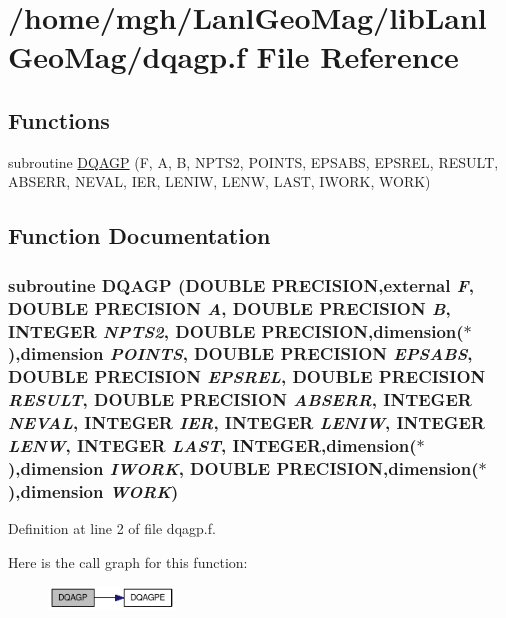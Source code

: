 \hypertarget{dqagp_8f}{
\section{/home/mgh/LanlGeoMag/libLanlGeoMag/dqagp.f File Reference}
\label{dqagp_8f}
}
\subsection*{Functions}
\begin{CompactItemize}
\item 
subroutine \hyperlink{dqagp_8f_3809d8d2a43b03d1f3c0f7833c0d82c8}{DQAGP} (F, A, B, NPTS2, POINTS, EPSABS, EPSREL, RESULT, ABSERR, NEVAL, IER, LENIW, LENW, LAST, IWORK, WORK)
\end{CompactItemize}


\subsection{Function Documentation}
\hypertarget{dqagp_8f_3809d8d2a43b03d1f3c0f7833c0d82c8}{
\subsubsection[{DQAGP}]{\setlength{\rightskip}{0pt plus 5cm}subroutine DQAGP (DOUBLE PRECISION,external {\em F}, \/  DOUBLE PRECISION {\em A}, \/  DOUBLE PRECISION {\em B}, \/  INTEGER {\em NPTS2}, \/  DOUBLE PRECISION,dimension($\ast$),dimension {\em POINTS}, \/  DOUBLE PRECISION {\em EPSABS}, \/  DOUBLE PRECISION {\em EPSREL}, \/  DOUBLE PRECISION {\em RESULT}, \/  DOUBLE PRECISION {\em ABSERR}, \/  INTEGER {\em NEVAL}, \/  INTEGER {\em IER}, \/  INTEGER {\em LENIW}, \/  INTEGER {\em LENW}, \/  INTEGER {\em LAST}, \/  INTEGER,dimension($\ast$),dimension {\em IWORK}, \/  DOUBLE PRECISION,dimension($\ast$),dimension {\em WORK})}}
\label{dqagp_8f_3809d8d2a43b03d1f3c0f7833c0d82c8}




Definition at line 2 of file dqagp.f.

Here is the call graph for this function:\nopagebreak
\begin{figure}[H]
\begin{center}
\leavevmode
\includegraphics[width=95pt]{dqagp_8f_3809d8d2a43b03d1f3c0f7833c0d82c8_cgraph}
\end{center}
\end{figure}
